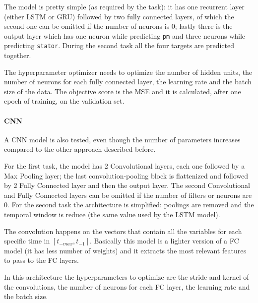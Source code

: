 The model is pretty simple (as required by the task): it has one recurrent layer (either LSTM or GRU) followed by two fully connected layers, of which the second one can be omitted if the number of neurons is 0; lastly there is the output layer which has one neuron while predicting \verb|pm| and three neurons while predicting \verb|stator|.
During the second task all the four targets are predicted together.

The hyperparameter optimizer needs to optimize the number of hidden units, the number of neurons for each fully connected layer, the learning rate and the batch size of the data.
The objective score is the MSE and it is calculated, after one epoch of training, on the validation set.

\paragraph{CNN}
A CNN model is also tested, even though the number of parameters increases compared to the other approach described before.

For the first task, the model has 2 Convolutional layers, each one followed by a Max Pooling layer; the last convolution-pooling block is flattenized and followed by 2 Fully Connected layer and then the output layer. The second Convolutional and Fully Connected layers can be omitted if the number of filters or neurons are 0. For the second task the architecture is simplified: poolings are removed and the temporal window is reduce (the same value used by the LSTM model).
 
The convolution happens on the vectors that contain all the variables for each specific time in %
$[t_{-max}, t_{-1}]$.
Basically this model is a lighter version of a FC model (it has less number of weights) and it extracts the most relevant features to pass to the FC layers.

In this architecture the hyperparameters to optimize are the stride and kernel of the convolutions, the number of neurons for each FC layer, the learning rate and the batch size.

